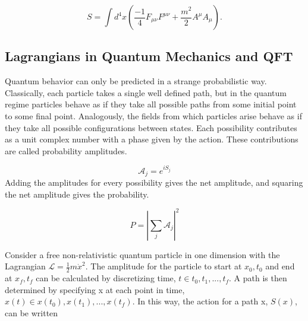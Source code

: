 \begin{equation}
S = \int d^4x \left( \frac{-1}{4}F_{\mu\nu}F^{\mu\nu}  + \frac{m^2}{2} A^\mu A_\mu \right).
\end{equation}

\subsection{Lagrangians in Quantum Mechanics and QFT}

Quantum behavior can only be predicted in a strange probabilistic way. Classically, each particle takes a single well defined path, but in the quantum regime particles behave as if they take all possible paths from some initial point to some final point. Analogously, the fields from which particles arise behave as if they take all possible configurations between states. Each possibility contributes as a unit complex number with a phase given by the action. These contributions are called probability amplitudes. 

\begin{equation}
\mathcal{A}_j = e^{iS_{j}} 
\end{equation}
Adding the amplitudes for every possibility gives the net amplitude, and squaring the net amplitude gives the probability.   

\begin{equation}
P = |\sum_j \mathcal{A}_j|^2
\end{equation}

Consider a free non-relativistic quantum particle in one dimension with the Lagrangian $\mathcal{L} = \frac{1}{2}m\dot{x}^2$. The amplitude for the particle to start at $x_0, t_0$ and end at $x_f, t_f$ can be calculated by discretizing time, $t \in {t_0, t_1, ..., t_f}$. A path is then determined by specifying x at each point in time, $x(t) \in {x(t_0), x(t_1), ..., x(t_f)}$. In this way, the action for a path x, $S(x)$, can be written

